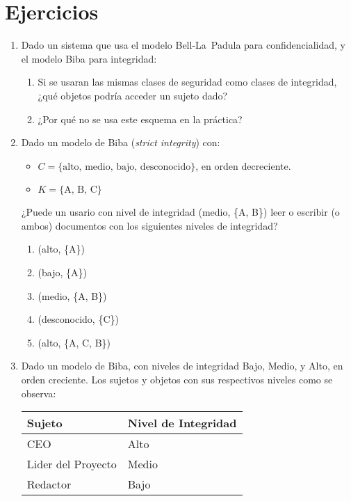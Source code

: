 
\section*{Ejercicios}
\begin{enumerate}
  \item Dado un sistema que usa el modelo Bell-La~Padula para confidencialidad,
    y el modelo Biba para integridad:
  \begin{enumerate}
    \item Si se usaran las mismas clases de seguridad como clases de integridad, ¿qué objetos podría acceder un sujeto dado?
    \item ¿Por qué no se usa este esquema en la práctica?
  \end{enumerate}
\item Dado un modelo de Biba (\textit{strict integrity}) con:
  \begin{itemize}
    \item $C = \{\text{alto, medio, bajo, desconocido}\}$, en orden decreciente.
    \item $K = \{\text{A, B, C}\}$ 
  \end{itemize}
¿Puede un usario con nivel de integridad (medio, \{A, B\}) leer o escribir (o
ambos) documentos con los siguientes niveles de integridad?
\begin{multicols}{3}
\begin{enumerate}

  \item (alto, \{A\})
  \item (bajo, \{A\})
  \item (medio, \{A, B\})
  \item (desconocido, \{C\})
  \item (alto, \{A, C, B\}) 
\end{enumerate}
\end{multicols}

\item Dado un modelo de Biba, con niveles de integridad Bajo, Medio, y Alto, en
  orden creciente. Los sujetos y objetos con sus respectivos niveles como se
  observa:
\begin{table}[h!]
  \centering
\begin{tabular}{l|l} 
 Sujeto & Nivel de Integridad \\ 
 \hline
CEO                 & Alto\\ 
Lider del Proyecto  & Medio\\ 
Redactor            & Bajo\\
\end{tabular}
\end{table}


\end{enumerate}
